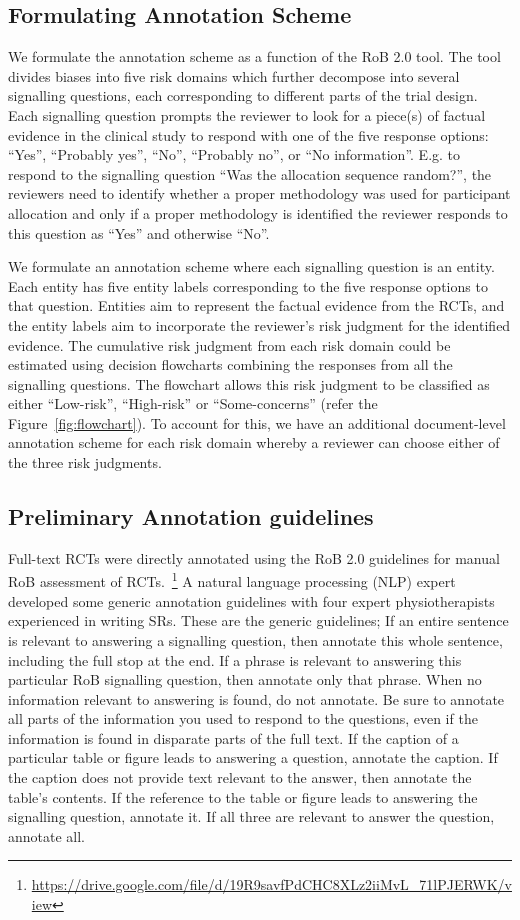 \documentclass{IOS-Book-Article}
\begin{document}
\subsection{Formulating Annotation Scheme}
%
We formulate the annotation scheme as a function of the RoB 2.0 tool.
The tool divides biases into five risk domains which further decompose into several signalling questions, each corresponding to different parts of the trial design.
Each signalling question prompts the reviewer to look for a piece(s) of factual evidence in the clinical study to respond with one of the five response options: ``Yes'', ``Probably yes'', ``No'', ``Probably no'', or ``No information''.
E.g. to respond to the signalling question ``Was the allocation sequence random?'', the reviewers need to identify whether a proper methodology was used for participant allocation and only if a proper methodology is identified the reviewer responds to this question as ``Yes'' and otherwise ``No''.

We formulate an annotation scheme where each signalling question is an entity.
Each entity has five entity labels corresponding to the five response options to that question.
Entities aim to represent the factual evidence from the RCTs, and the entity labels aim to incorporate the reviewer's risk judgment for the identified evidence.
The cumulative risk judgment from each risk domain could be estimated using decision flowcharts combining the responses from all the signalling questions.
The flowchart allows this risk judgment to be classified as either ``Low-risk'', ``High-risk'' or ``Some-concerns'' (refer the Figure~\ref{fig:flowchart}).
To account for this, we have an additional document-level annotation scheme for each risk domain whereby a reviewer can choose either of the three risk judgments.
%
%
%
\subsection{Preliminary Annotation guidelines}
\label{subsec:annot_guide}
%
Full-text RCTs were directly annotated using the RoB 2.0 guidelines for manual RoB assessment of RCTs.~\footnote{\url{https://drive.google.com/file/d/19R9savfPdCHC8XLz2iiMvL_71lPJERWK/view}}
A natural language processing (NLP) expert developed some generic annotation guidelines with four expert physiotherapists experienced in writing SRs.
These are the generic guidelines; If an entire sentence is relevant to answering a signalling question, then annotate this whole sentence, including the full stop at the end.
If a phrase is relevant to answering this particular RoB signalling question, then annotate only that phrase.
When no information relevant to answering is found, do not annotate.
Be sure to annotate all parts of the information you used to respond to the questions, even if the information is found in disparate parts of the full text.
If the caption of a particular table or figure leads to answering a question, annotate the caption.
If the caption does not provide text relevant to the answer, then annotate the table's contents.
If the reference to the table or figure leads to answering the signalling question, annotate it.
If all three are relevant to answer the question, annotate all.
%
\end{document}
